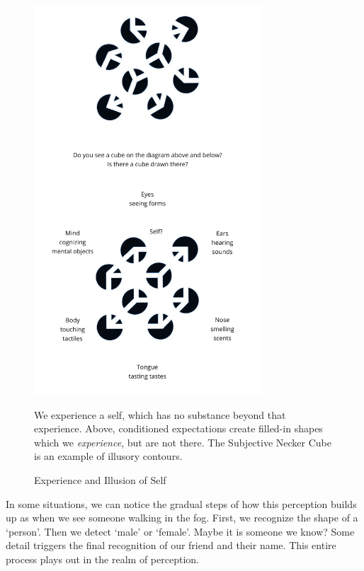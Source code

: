 \begin{figure}[h]
\vspace*{-15pt}
\caption{Experience and Illusion of Self}\label{fig-illusion-of-self}

\centering

\includegraphics[width=85mm]{./manuscript/tex/diagrams/senses-self-illusion.pdf}

\begin{minipage}{0.8\linewidth}
\centering\footnotesize
We experience a self, which has no substance beyond that experience.
Above, conditioned expectations create filled-in shapes which we \emph{experience}, but are not there.
The Subjective Necker Cube is an example of illusory contours.
\end{minipage}

\end{figure}

\clearpage
\normalpagelayout

In some situations, we can notice the gradual steps of how this
perception builds up as when we see someone walking in the fog. First,
we recognize the shape of a `person'. Then we detect `male' or `female'.
Maybe it is someone we know? Some detail triggers the final recognition
of our friend and their name. This entire process plays out in the realm
of perception.


